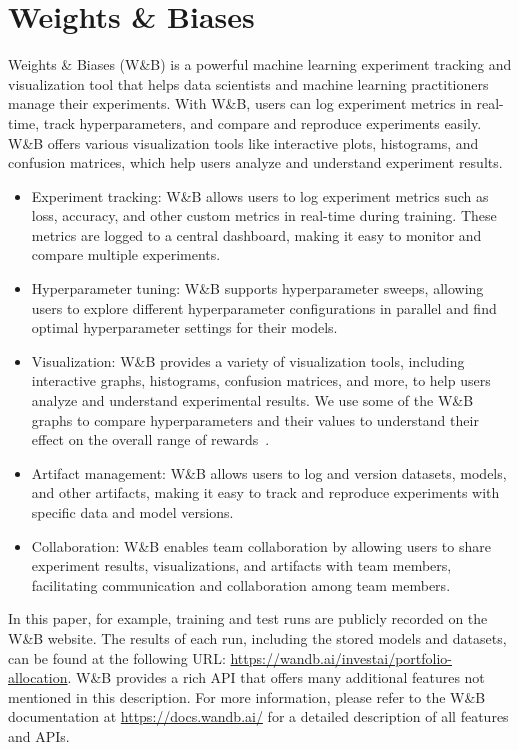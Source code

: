 \documentclass[../xlapes02]{subfiles}
\begin{document}
    \section{Weights \& Biases}\label{sec:wandb}
    Weights \& Biases (W\&B) is a powerful machine learning experiment tracking and visualization tool that helps data scientists and machine learning practitioners manage their experiments. With W\&B, users can log experiment metrics in real-time, track hyperparameters, and compare and reproduce experiments easily. W\&B offers various visualization tools like interactive plots, histograms, and confusion matrices, which help users analyze and understand experiment results.

    \begin{itemize}
        \item Experiment tracking: W\&B allows users to log experiment metrics such as loss, accuracy, and other custom metrics in real-time during training. These metrics are logged to a central dashboard, making it easy to monitor and compare multiple experiments.
        \item Hyperparameter tuning: W\&B supports hyperparameter sweeps, allowing users to explore different hyperparameter configurations in parallel and find optimal hyperparameter settings for their models.
        \item Visualization: W\&B provides a variety of visualization tools, including interactive graphs, histograms, confusion matrices, and more, to help users analyze and understand experimental results. We use some of the W\&B graphs to compare hyperparameters and their values to understand their effect on the overall range of rewards~.
        \item Artifact management: W\&B allows users to log and version datasets, models, and other artifacts, making it easy to track and reproduce experiments with specific data and model versions.
        \item Collaboration: W\&B enables team collaboration by allowing users to share experiment results, visualizations, and artifacts with team members, facilitating communication and collaboration among team members.
    \end{itemize}

    In this paper, for example, training and test runs are publicly recorded on the W\&B website. The results of each run, including the stored models and datasets, can be found at the following URL: \url{https://wandb.ai/investai/portfolio-allocation}. W\&B provides a rich API that offers many additional features not mentioned in this description. For more information, please refer to the W\&B documentation at \url{https://docs.wandb.ai/} for a detailed description of all features and APIs.
\end{document}
